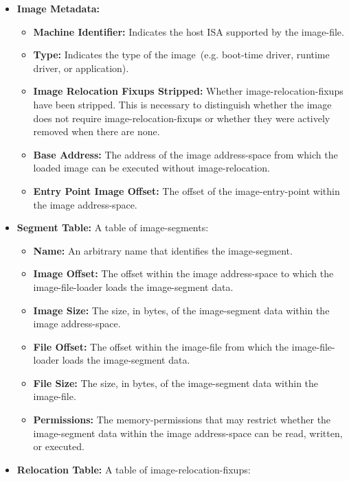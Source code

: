 \begin{itemize}
  \item \textbf{Image Metadata:}
  \begin{itemize}
    \item \textbf{Machine Identifier:} Indicates the host \gls{ISA} supported by the \gls{image-file}.
    \item \textbf{Type:} Indicates the type of the \gls{image}~(e.g. boot-time driver, runtime driver, or application).
    \item \textbf{Image Relocation Fixups Stripped:} Whether \glspl{image-relocation-fixup} have been stripped. This is necessary to distinguish whether the \gls{image} does not require \glspl{image-relocation-fixup} or whether they were actively removed when there are none.
    \item \textbf{Base Address:} The address of the \gls{image} \gls{address-space} from which the loaded \gls{image} can be executed without \gls{image-relocation}.
    \item \textbf{Entry Point Image Offset:} The offset of the \gls{image-entry-point} within the \gls{image} \gls{address-space}.
  \end{itemize}
  \item \textbf{Segment Table:} A table of \glspl{image-segment}:
  \begin{itemize}
    \item \textbf{Name:} An arbitrary name that identifies the \gls{image-segment}.
    \item \textbf{Image Offset:} The offset within the \gls{image} \gls{address-space} to which the \gls{image-file-loader} loads the \gls{image-segment} data.
    \item \textbf{Image Size:} The size, in \glspl{byte}, of the \gls{image-segment} data within the \gls{image} \gls{address-space}.
    \item \textbf{File Offset:} The offset within the \gls{image-file} from which the \gls{image-file-loader} loads the \gls{image-segment} data.
    \item \textbf{File Size:} The size, in \glspl{byte}, of the \gls{image-segment} data within the \gls{image-file}.
    \item \textbf{Permissions:} The \glspl{memory-permission} that may restrict whether the \gls{image-segment} data within the \gls{image} \gls{address-space} can be read, written, or executed.
  \end{itemize}
  \item \textbf{Relocation Table:} A table of \glspl{image-relocation-fixup}:

\end{itemize}
